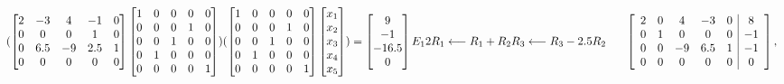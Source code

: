 \documentclass[11pt,a4paper]{article}
\begin{document}
\[
(\begin{bmatrix}
   2 & -3 & 4 & -1 & 0\\
   0 & 0 & 0 & 1 & 0\\
   0 & 6.5 & -9 & 2.5 & 1\\
   0 & 0 & 0 & 0 & 0
\end{bmatrix} \begin{bmatrix}
                1 & 0 & 0 & 0 & 0\\
                0 & 0 & 0 & 1 & 0\\
                0 & 0 & 1 & 0 & 0\\
                0 & 1 & 0 & 0 & 0\\
                0 & 0 & 0 & 0 & 1
              \end{bmatrix})( \begin{bmatrix}
                                1 & 0 & 0 & 0 & 0\\
                                0 & 0 & 0 & 1 & 0\\
                                0 & 0 & 1 & 0 & 0\\
                                0 & 1 & 0 & 0 & 0\\
                                0 & 0 & 0 & 0 & 1
                              \end{bmatrix} \begin{bmatrix}
                                            x_1 \\ x_2 \\ x_3 \\ x_4 \\x_5
                                             \end{bmatrix} )
= \begin{bmatrix}
9\\-1\\-16.5\\0
\end{bmatrix}\\

E_12\\

R_1 \longleftarrow R_1 + R_2\\

R_3 \longleftarrow R_3 - 2.5 R_2
~~~~~\left[{\begin{array}{ccccc|c}
2 & 0 & 4 & -3 & 0 & 8\\
0 & 1 & 0 & 0 & 0 & -1\\
0 & 0 & -9 & 6.5 & 1 & -1 \\
0 & 0 & 0 & 0 & 0 & 0
\end{array}}\right] , \\

\]
\end{document}
